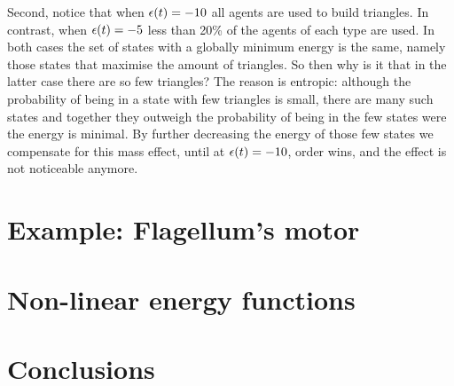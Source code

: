 Second, notice that %
when $\epsilon(t) = -10$ all agents are used to build triangles.
In contrast, when $\epsilon(t) = -5$ less than 20\%
of the agents of each type are used.
In both cases the set of states
with a globally minimum energy is the same,
namely those states that maximise the amount of triangles.
So then why is it that in the latter case there are so few triangles?
The reason is entropic:
although the probability of being in a state with few triangles is small,
there are many such states and together they outweigh
the probability of being in the few states were the energy is minimal.
By further decreasing the energy of those few states
we compensate for this mass effect,
until at $\epsilon(t) = -10$, order wins,
and the effect is not noticeable anymore.


\section{Example: Flagellum's motor}
\label{sec:alloring}


\section{Non-linear energy functions}
\label{sec:non-linear-energy}


\section{Conclusions}
\label{sec:direct-conclusions}




